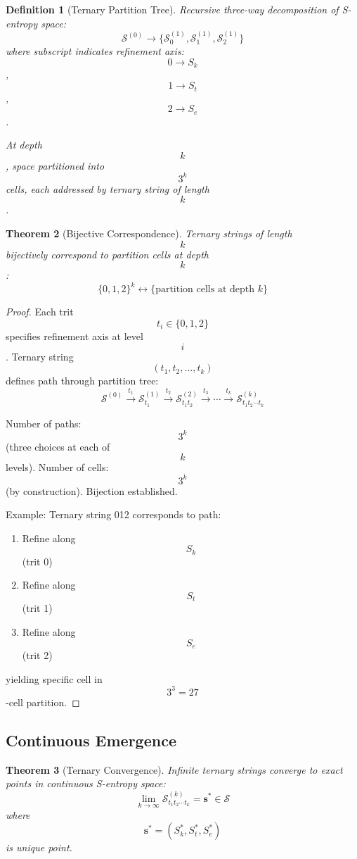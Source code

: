 \documentclass[11pt,twocolumn,a4paper]{article}
\newtheorem{theorem}{Theorem}[section]
\newtheorem{definition}[theorem]{Definition}
\theoremstyle{remark}
\begin{document}
\begin{definition}[Ternary Partition Tree]
\label{def:ternary_tree}
Recursive three-way decomposition of S-entropy space:
$$
\mathcal{S}^{(0)} \to \{\mathcal{S}_0^{(1)}, \mathcal{S}_1^{(1)}, \mathcal{S}_2^{(1)}\}
$$
where subscript indicates refinement axis: $$0 \to S_k$$, $$1 \to S_t$$, $$2 \to S_e$$.

At depth $$k$$, space partitioned into $$3^k$$ cells, each addressed by ternary string of length $$k$$.
\end{definition}

\begin{theorem}[Bijective Correspondence]
\label{thm:ternary_bijection}
Ternary strings of length $$k$$ bijectively correspond to partition cells at depth $$k$$:
$$
\{0,1,2\}^k \leftrightarrow \{\text{partition cells at depth } k\}
$$
\end{theorem}

\begin{proof}
Each trit $$t_i \in \{0,1,2\}$$ specifies refinement axis at level $$i$$. Ternary string $$(t_1, t_2, \ldots, t_k)$$ defines path through partition tree:
$$
\mathcal{S}^{(0)} \xrightarrow{t_1} \mathcal{S}_{t_1}^{(1)} \xrightarrow{t_2} \mathcal{S}_{t_1 t_2}^{(2)} \xrightarrow{t_3} \cdots \xrightarrow{t_k} \mathcal{S}_{t_1 t_2 \cdots t_k}^{(k)}
$$

Number of paths: $$3^k$$ (three choices at each of $$k$$ levels).
Number of cells: $$3^k$$ (by construction).
Bijection established.

Example: Ternary string 012 corresponds to path:
\begin{enumerate}
\item Refine along $$S_k$$ (trit 0)
\item Refine along $$S_t$$ (trit 1)
\item Refine along $$S_e$$ (trit 2)
\end{enumerate}
yielding specific cell in $$3^3 = 27$$-cell partition.
\end{proof}

\subsection{Continuous Emergence}

\begin{theorem}[Ternary Convergence]
\label{thm:ternary_convergence}
Infinite ternary strings converge to exact points in continuous S-entropy space:
$$
\lim_{k \to \infty} \mathcal{S}_{t_1 t_2 \cdots t_k}^{(k)} = \mathbf{s}^* \in \mathcal{S}
$$
where $$\mathbf{s}^* = (S_k^*, S_t^*, S_e^*)$$ is unique point.
\end{theorem}
\end{document}
